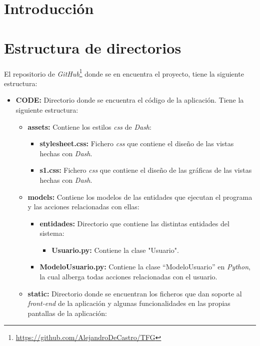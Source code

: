 
\section{Introducción}

\section{Estructura de directorios}

El repositorio de \textit{GitHub}\footnote{\url{https://github.com/AlejandroDeCastro/TFG}} donde se en encuentra el proyecto, tiene la siguiente estructura:
\begin{itemize}
    \item \textbf{CODE:} Directorio donde se encuentra el código de la aplicación. Tiene la siguiente estructura:
    \begin{itemize}
        \item \textbf{assets:} Contiene los estilos \textit{css} de \textit{Dash}:
        \begin{itemize}
            \item \textbf{stylesheet.css:} Fichero \textit{css} que contiene el diseño de las vistas hechas con \textit{Dash}.
            \item \textbf{s1.css:} Fichero \textit{css} que contiene el diseño de las gráficas de las vistas hechas con \textit{Dash}.
        \end{itemize}
        \item \textbf{models:} Contiene los modelos de las entidades que ejecutan el programa y las acciones relacionadas con ellas:
        \begin{itemize}
            \item \textbf{entidades:} Directorio que contiene las distintas entidades del sistema:
            \begin{itemize}
                \item \textbf{Usuario.py:} Contiene la clase "Usuario". 
            \end{itemize}
            \item \textbf{ModeloUsuario.py:} Contiene la clase ``ModeloUsuario'' en \textit{Python}, la cual alberga todas acciones relacionadas con el usuario.
        \end{itemize}
        \item \textbf{static:} Directorio donde se encuentran los ficheros que dan soporte al \textit{front-end} de la aplicación y algunas funcionalidades en las propias pantallas de la aplicación:

\end{itemize}
\end{itemize}
